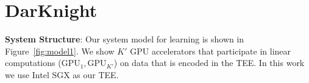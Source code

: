 \section{DarKnight}
\label{sec:model}
\textbf{System Structure}: Our system model for learning is shown in Figure~\ref{fig:model1}. %
We show $K'$ GPU accelerators that participate in linear computations ($\text{GPU}_1, \text{GPU}_{K'}$) on data that is encoded in the TEE. In this work we use Intel SGX as our TEE.




